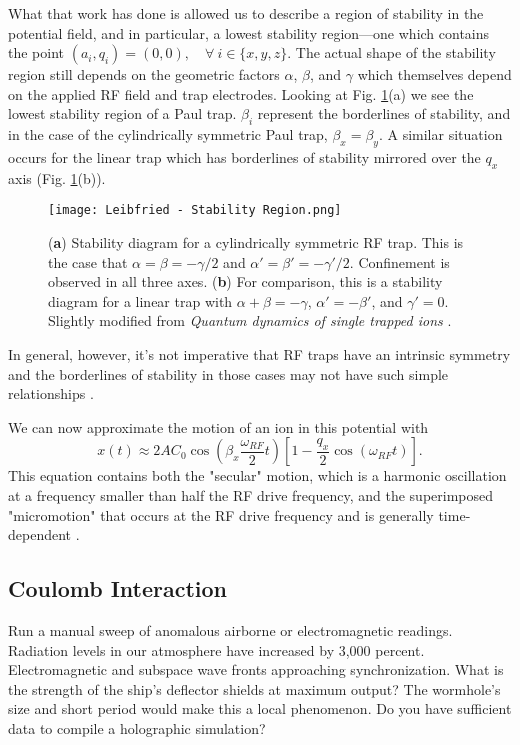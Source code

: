 What that work has done is allowed us to describe a region of stability in the potential field, and in particular, a lowest stability region---one which contains the point $(a_i, q_i) = (0,0), \quad \forall \: i \in \{x, y, z\}$. The actual shape of the stability region still depends on the geometric factors $\alpha$, $\beta$, and $\gamma$ which themselves depend on the applied RF field and trap electrodes. Looking at Fig. \ref{fig:Stability Region}(a) we see the lowest stability region of a Paul trap. $\beta_i$ represent the borderlines of stability, and in the case of the cylindrically symmetric Paul trap, $\beta_x = \beta_y$. A similar situation occurs for the linear trap which has borderlines of stability mirrored over the $q_x$ axis (Fig. \ref{fig:Stability Region}(b)).
\begin{figure}[h]
    \texttt{[image: Leibfried - Stability Region.png]}
    \caption{(\textbf{a}) Stability diagram for a cylindrically symmetric RF trap. This is the case that $\alpha=\beta = -\gamma/2$ and $\alpha'=\beta' = -\gamma'/2$. Confinement is observed in all three axes. (\textbf{b}) For comparison, this is a stability diagram for a linear trap with $\alpha+\beta = -\gamma$, $\alpha' = -\beta'$, and $\gamma'=0$. Slightly modified from \textit{Quantum dynamics of single trapped ions} \cite{Leibfried}.}
    \label{fig:Stability Region}
\end{figure}
In general, however, it's not imperative that RF traps have an intrinsic symmetry and the borderlines of stability in those cases may not have such simple relationships \cite{Leibfried}.

We can now approximate the motion of an ion in this potential with
\begin{equation}
    x(t) \approx 2AC_0 \cos\left( \beta_x \frac{\omega_{RF}}{2} t \right) \left[ 1 - \frac{q_x}{2} \cos(\omega_{RF} t) \right].
\end{equation}
This equation contains both the "secular" motion, which is a harmonic oscillation at a frequency smaller than half the RF drive frequency, and the superimposed "micromotion" that occurs at the RF drive frequency and is generally time-dependent \cite{Bruzewicz}.

\subsection{Coulomb Interaction}
Run a manual sweep of anomalous airborne or electromagnetic readings. Radiation levels in our atmosphere have increased by 3,000 percent. Electromagnetic and subspace wave fronts approaching synchronization. What is the strength of the ship's deflector shields at maximum output? The wormhole's size and short period would make this a local phenomenon. Do you have sufficient data to compile a holographic simulation?

